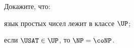 Докажите, что:
\begin{enumcyr}
    \item язык простых чисел лежит в классе $\UP$;
    \item если $\USAT \in \UP$, то $\NP = \coNP$.
\end{enumcyr}
